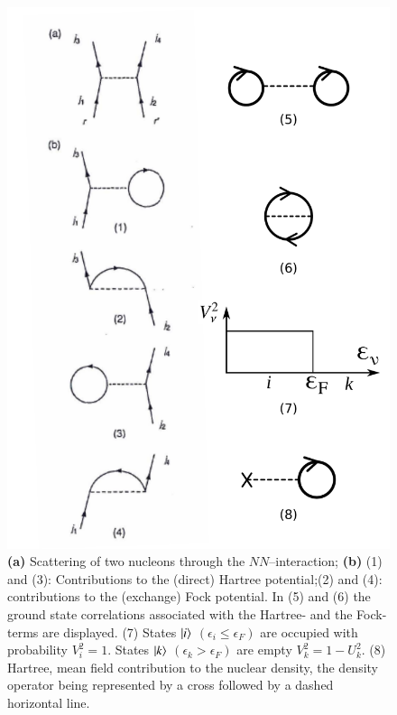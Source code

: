 \begin{figure}
	\centerline {
		\includegraphics*[width=12cm]{introduccion/figs/figpreface6}
	}
	\caption{\textbf{(a)} Scattering of two nucleons through the  $NN$--interaction; \textbf{(b)} (1) and (3): Contributions to the (direct) Hartree potential;(2) and (4): contributions to the (exchange) Fock potential. In (5) and (6) the ground state correlations associated with the Hartree- and the Fock-terms are displayed. (7) States $|{i} \rangle$ $(\epsilon_i\leq\epsilon_F)$ are occupied with probability $V^2_i=1$. States $|{k} \rangle$ $(\epsilon_k>\epsilon_F)$ are empty $V^2_k=1-U^2_k$. (8) Hartree, mean field contribution to the  nuclear density, the density operator being represented by a cross followed by a dashed horizontal line.}
	\label{fig1.0.6}
\end{figure}
